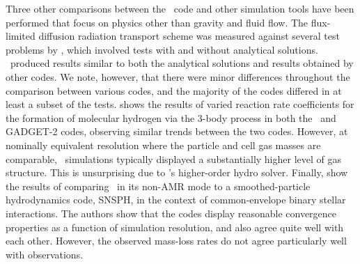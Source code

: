 Three other comparisons between the \enzo\ code and other simulation
tools have been performed that focus on physics other than gravity and
fluid flow.  The flux-limited diffusion radiation transport scheme was
measured against several test problems by \citet{IlievEtAl2009},
which involved tests with and without analytical solutions.  \enzo\ produced
results similar to both the analytical solutions and results obtained by 
other codes.  We note, however, that there were minor differences throughout
the comparison between various codes, and the majority of the codes differed
in at least a subset of the tests.
\citet{2011ApJ...726...55T} shows the results of varied reaction rate
coefficients for the formation of molecular hydrogen via the 3-body
process in both the \enzo\ and GADGET-2 codes, observing similar trends between
the two codes. However, at nominally equivalent resolution
where the particle and cell gas masses are comparable, 
\enzo\ simulations typically displayed a
substantially higher level of gas structure.  This is unsurprising due
to \enzo's higher-order hydro solver.  Finally,
\citet{2012ApJ...744...52P} show the results of comparing \enzo\ in
its non-AMR mode to a smoothed-particle hydrodynamics code, SNSPH, in
the context of common-envelope binary stellar interactions.  The
authors show that the codes display reasonable convergence properties
as a function of simulation resolution, and also agree quite well with
each other. However, the observed mass-loss rates do not agree
particularly well with observations.
